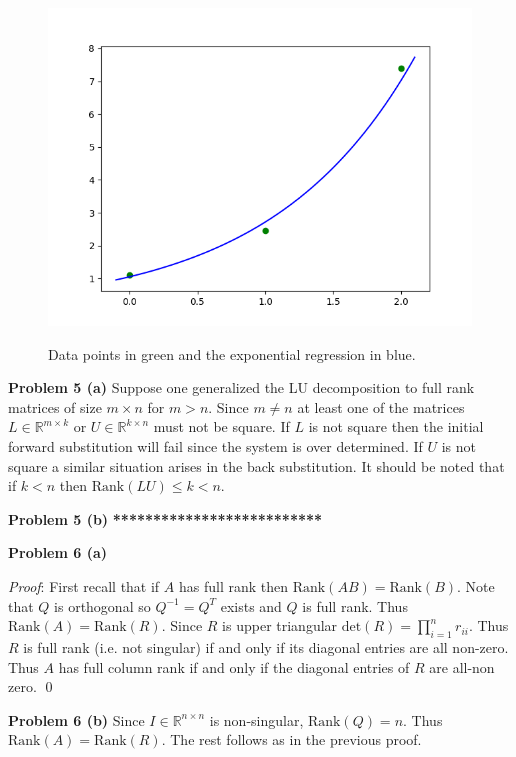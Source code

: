 \documentclass[12pt]{article}
\newcommand{\problem}[1]{\hspace{-4 ex} \large \textbf{Problem #1} }
\renewenvironment{proof}{\hspace{-4 ex} \emph{Proof}:}{\qed}
\newcommand{\RR}{\mathbb{R}}
\begin{document}
\begin{figure}[H]
	\caption{Data points in green and the exponential regression in blue.}
	\includegraphics[width=.75\textwidth]{hw1_figure_1.png}
	\label{p1_T_err}
	\centering
\end{figure}

\problem{5 (a)} Suppose one generalized the LU decomposition to full rank matrices of size $m \times n$ for $m>n$. Since $m \ne n$ at least one of the matrices $L \in \RR^{m \times k}$ or $U\in \RR^{k \times n}$ must not be square. If $L$ is not square then the initial forward substitution will fail since the system is over determined. If $U$ is not square a similar situation arises in the back substitution. It should be noted that if $k<n$ then $\text{Rank}(LU) \le k < n$.

\bigbreak
\problem{5 (b)} \textbf{**************************}

\bigbreak
\problem{6 (a)} 

\begin{proof} First recall that if $A$ has full rank then $\text{Rank}(AB) = \text{Rank}(B)$. \bigbreak
	Note that $Q$ is orthogonal so $Q^{-1} = Q^T$ exists and $Q$ is full rank. Thus $\text{Rank}(A) = \text{Rank}(R)$. Since $R$ is upper triangular $\text{det}(R) = \prod\limits_{i=1}^n r_{ii}$. Thus $R$ is full rank (i.e. not singular) if and only if its diagonal entries are all non-zero. Thus $A$ has full column rank if and only if the diagonal entries of $R$ are all-non zero.
\end{proof}

\bigbreak
\problem{6 (b)} Since $I \in \RR^{n\times n}$ is non-singular, $\text{Rank}(Q) = n$. Thus $\text{Rank}(A) = \text{Rank}(R)$. The rest follows as in the previous proof.
\end{document}
